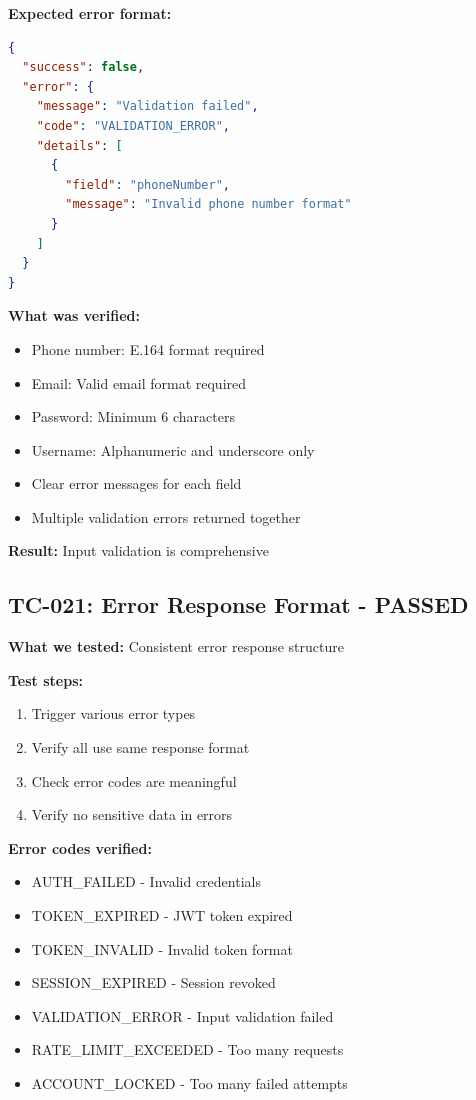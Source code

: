 \documentclass[11pt,a4paper]{article}
\begin{document}
\textbf{Expected error format:}
\begin{lstlisting}[language=json]
{
  "success": false,
  "error": {
    "message": "Validation failed",
    "code": "VALIDATION_ERROR",
    "details": [
      {
        "field": "phoneNumber",
        "message": "Invalid phone number format"
      }
    ]
  }
}
\end{lstlisting}

\textbf{What was verified:}
\begin{itemize}
    \item Phone number: E.164 format required
    \item Email: Valid email format required
    \item Password: Minimum 6 characters
    \item Username: Alphanumeric and underscore only
    \item Clear error messages for each field
    \item Multiple validation errors returned together
\end{itemize}

\textbf{Result:} Input validation is comprehensive

\subsection{TC-021: Error Response Format - PASSED}
\textbf{What we tested:} Consistent error response structure

\textbf{Test steps:}
\begin{enumerate}
    \item Trigger various error types
    \item Verify all use same response format
    \item Check error codes are meaningful
    \item Verify no sensitive data in errors
\end{enumerate}

\textbf{Error codes verified:}
\begin{itemize}
    \item AUTH\_FAILED - Invalid credentials
    \item TOKEN\_EXPIRED - JWT token expired
    \item TOKEN\_INVALID - Invalid token format
    \item SESSION\_EXPIRED - Session revoked
    \item VALIDATION\_ERROR - Input validation failed
    \item RATE\_LIMIT\_EXCEEDED - Too many requests
    \item ACCOUNT\_LOCKED - Too many failed attempts
\end{itemize}
\end{document}
